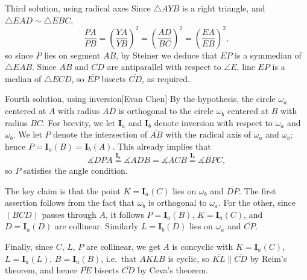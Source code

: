 \begin{customenv}{Third solution, using radical axes}
    Since $\triangle AYB$ is a right triangle, and $\triangle EAD\sim\triangle EBC$, \[\frac{PA}{PB}=\left(\frac{YA}{YB}\right)^2=\left(\frac{AD}{BC}\right)^2=\left(\frac{EA}{EB}\right)^2,\]
    so since $P$ lies on segment $AB$, by Steiner we deduce that $\overline{EP}$ is a symmedian of $\triangle EAB$. Since $\overline{AB}$ and $\overline{CD}$ are antiparallel with respect to $\angle E$, line $EP$ is a median of $\triangle ECD$, so $\overline{EP}$ bisects $\overline{CD}$, as required. 
\end{customenv}
\begin{customenv}{Fourth solution, using inversion}[Evan Chen]
    By the hypothesis, the circle $\omega_a$ centered at $A$ with radius $AD$ is orthogonal to the circle $\omega_b$ centered at $B$ with radius $BC$. For brevity, we let $\mathbf{I}_a$ and $\mathbf{I}_b$ denote inversion with respect to $\omega_a$ and $\omega_b$. We let $P$ denote the intersection of $\overline{AB}$ with the radical axis of $\omega_a$ and $\omega_b$; hence $P = \mathbf I_a(B) = \mathbf I_b(A)$. This already implies that \[\measuredangle DPA \overset{\mathbf{I}_a}=\measuredangle ADB=\measuredangle ACB \overset{\mathbf{I}_b}=\measuredangle BPC,\]
    so $P$ satisfies the angle condition.

    The key claim is that the point $K=\mathbf I_a(C)$ lies on $\omega_b$ and $\overline{DP}$. The first assertion follows from the fact that $\omega_b$ is orthogonal to $\omega_a$. For the other, since $(BCD)$ passes through $A$, it follows $P=\mathbf I_a(B)$, $K=\mathbf I_a(C)$, and $D=\mathbf I_a(D)$ are collinear. Similarly $L=\mathbf I_b(D)$ lies on  $\omega_a$ and $\overline{CP}$.

    Finally, since $C$, $L$, $P$ are collinear, we get $A$ is concyclic with $K=\mathbf I_a(C)$, $L=\mathbf I_a(L)$, $B=\mathbf I_a(B)$, i.e.\ that $AKLB$ is cyclic, so $\overline{KL}\parallel\overline{CD}$ by Reim's theorem, and hence $\overline{PE}$ bisects $\overline{CD}$ by Ceva's theorem.
\end{customenv}

